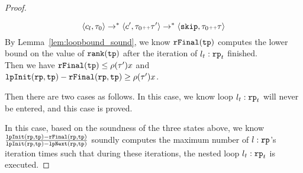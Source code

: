 \begin{proof}
\begin{itemize}
  \[
    \langle c_l, \mathtt{\tau}_0 \rangle \to^* \langle c', \mathtt{\tau}_0 {\scriptscriptstyle ++} \mathtt{\tau}' \rangle \to^* \langle \mathtt{skip}, \mathtt{\tau}_0 {\scriptscriptstyle ++} \mathtt{\tau} \rangle
  \]
  By Lemma~\ref{lem:loopbound_sound}, we know $\mathtt{rFinal}(\mathtt{tp})$ computes the lower bound on the value of $\mathtt{rank}(\mathtt{tp})$ after the iteration of $l_t:\mathtt{rp}_t$ finished.
  \\
  Then we have 
  $\mathtt{rFinal}(\mathtt{tp}) \leq \rho(\mathtt{\tau}') x$ and $\mathtt{lpInit}(\mathtt{rp}, \mathtt{tp}) - \mathtt{rFinal}(\mathtt{rp}, \mathtt{tp}) \geq \rho(\mathtt{\tau}') x$.
\end{itemize}
Then there are two cases as follows.
In this case, we know loop $l_t: \mathtt{rp}_t$ will never be entered, and this case is proved.

In this case, based on the soundness of the three states above, we know 
$\frac{\mathtt{lpInit}(\mathtt{rp}, \mathtt{tp}) - \mathtt{rFinal}(\mathtt{rp}, \mathtt{tp})}{\mathtt{lpInit}(\mathtt{rp}, \mathtt{tp}) - \mathtt{lpNext}(\mathtt{rp}, \mathtt{tp})}$ 
soundly computes the maximum number of $l: \mathtt{rp}$'s iteration times such that during these iterations, the nested loop $l_t: \mathtt{rp}_t$ is executed.
\end{proof}
